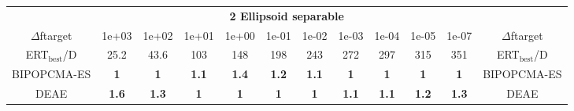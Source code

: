 \begin{tabular}{cccccccccccc}
 & \multicolumn{10}{c}{{\normalsize \textbf{2 Ellipsoid separable}}}\\
$\Delta$ftarget& 1e+03& 1e+02& 1e+01& 1e+00& 1e-01& 1e-02& 1e-03& 1e-04& 1e-05& 1e-07 & $\Delta$ftarget \\
ERT$_{\textrm{best}}$/D& 25.2& 43.6& 103& 148& 198& 243& 272& 297& 315& 351 & ERT$_{\textrm{best}}$/D \\
\hline
BIPOPCMA-ES & \textbf{1} & \textbf{1} & \textbf{1.1} & \textbf{1.4} & \textbf{1.2} & \textbf{1.1} & \textbf{1} & \textbf{1} & \textbf{1} & \textbf{1} & BIPOPCMA-ES \cite{add_an_entry_for_BIPOPCMA-ES_in_bbob.bib}\\
DEAE & \textbf{1.6} & \textbf{1.3} & \textbf{1} & \textbf{1} & \textbf{1} & \textbf{1} & \textbf{1.1} & \textbf{1.1} & \textbf{1.2} & \textbf{1.3} & DEAE \cite{add_an_entry_for_DEAE_in_bbob.bib}
\end{tabular}
